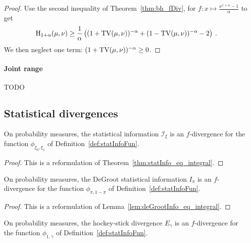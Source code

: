\begin{proof}%
{}
Use the second inequality of Theorem~\ref{thm:bh_fDiv}, for $f: x \mapsto \frac{x^{1+\alpha} - 1}{\alpha}$ to get
\begin{align*}
\operatorname{H}_{1+\alpha}(\mu, \nu) \ge \frac{1}{\alpha} \left((1 + \operatorname{TV}(\mu, \nu))^{-\alpha} + (1 - \operatorname{TV}(\mu, \nu))^{-\alpha} - 2 \right) \: .
\end{align*}
We then neglect one term: $(1 + \operatorname{TV}(\mu, \nu))^{-\alpha} \ge 0$.
\end{proof}


\paragraph{Joint range}

TODO \cite{harremoes2011pairs}


\subsection{Statistical divergences}

\begin{lemma}
  \label{lem:statInfo_eq_fDiv}
  On probability measures, the statistical information $\mathcal I_\xi$ is an $f$-divergence for the function $\phi_{\xi_0, \xi_1}$ of Definition~\ref{def:statInfoFun}.
\end{lemma}

\begin{proof}%
{}
This is a reformulation of Theorem~\ref{thm:statInfo_eq_integral}.
\end{proof}

\begin{lemma}
  \label{lem:deGrootInfo_eq_fDiv}
  On probability measures, the DeGroot statistical information $I_\pi$ is an $f$-divergence for the function $\phi_{\pi, 1-\pi}$ of Definition~\ref{def:statInfoFun}.
\end{lemma}

\begin{proof}%
{}
This is a reformulation of Lemma~\ref{lem:deGrootInfo_eq_integral}.
\end{proof}

\begin{lemma}
  \label{lem:eGamma_eq_fDiv}
  On probability measures, the hockey-stick divergence $E_\gamma$ is an $f$-divergence for the function $\phi_{1,\gamma}$ of Definition~\ref{def:statInfoFun}.
\end{lemma}

